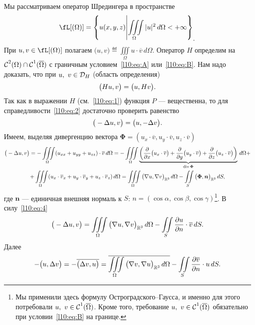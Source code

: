 Мы рассматриваем оператор Шредингера в пространстве 
\begin{equation*}
	\hfill\fL[(\Omega)]=\left\{u(x,y,z)\middle|\iiint\limits_{\Omega}|u|^2\,d\Omega<+\infty\right\}_{\displaystyle.}\hfill
\end{equation*}
При $u,v\in\fL[(\Omega)]$ полагаем $\displaystyle\big(u,v\big)\eqdef\iiint\limits_{\Omega}u\cdot\overline{v}\,d\Omega$. Оператор $H$ определим на $\mathcal{C}{\mathstrut}^{2}_{}(\Omega)\cap\mathcal{C}{\mathstrut}^{1}_{}(\overline{\Omega})$ с граничным условием~\eqref{l10:eq:A} или~\eqref{l10:eq:B}. Нам надо доказать, что при $u,\ v\in\mc{D}_{H}$ (область определения)
\begin{equation}\label{l10:eq:2}
	\hfill\big(Hu,v\big)=\big(u,Hv\big).\hfill
\end{equation}
Так как в выражении $H$ (см.~\eqref{l10:eq:1}) функция $P$ --- вещественна, то для справедливости~\eqref{l10:eq:2} достаточно проверить равенство
\begin{equation}\label{l10:eq:3}
	\hfill\big(-\Delta u,v\big)=\big(u,-\Delta v\big).\hfill
\end{equation}
Имеем, выделяя дивергенцию вектора $\bm{\Phi}=(u_x\cdot\overline{v},u_y\cdot\overline{v},u_z\cdot\overline{v})$
\begin{multline}\label{l10:eq:4}
	\big(-\Delta u,v\big)=-\iiint\limits_{\Omega}(u_{xx}+u_{yy}+u_{zz})\cdot\overline{v}\,d\Omega=-\iiint\limits_{\Omega}\underbrace{\left(\frac{\partial}{\partial x}\big(u_x\cdot\overline{v}\big)+\frac{\partial}{\partial y}\big(u_y\cdot\overline{v}\big)+\frac{\partial}{\partial z}\big(u_z\cdot\overline{v}\big)\right)}_{\operatorname{div}\bm{\Phi}}\,d\Omega+\\
	+\iiint\limits_{\Omega}(u_x\cdot\overline{v}_x+u_y\cdot\overline{v}_y+u_z\cdot\overline{v}_z)\,d\Omega=\iiint\limits_{\Omega}\big(\nabla u,\nabla v\big)_{\mathbb{R}^3}\,d\Omega-\iint\limits_{S}\big(\bm{\Phi},\bm{n}\big)_{\mathbb{R}^3}\,dS,
\end{multline}
где $\bm{n}$ --- единичная внешняя нормаль к $S$: $n=(\cos\alpha,\cos\beta,\cos\gamma)$\footnote{Мы применили здесь формулу Остроградского--Гаусса, и именно для этого потребовали $u,\ v\in\Cfn{1}(\overline{\Omega})$. Кроме того, требование $u,\ v\in\Cfn{1}(\overline{\Omega})$ обязательно при условии~\eqref{l10:eq:B} на границе.}. %
В силу~\eqref{l10:eq:4}
\begin{equation}\label{l10:eq:5}
	\big(-\Delta u,v\big)=\iiint\limits_{\Omega}\big(\nabla u,\nabla v\big)_{\mathbb{R}^3}\,d\Omega-\iint\limits_{S}\frac{\partial u}{\partial n}\cdot\overline{v}\,dS.
\end{equation}
Далее
\begin{equation}\label{l10:eq:6}
	-\big(u,\Delta v\big)=-\overline{\big(\Delta v,u\big)}=\overline{\iiint\limits_{\Omega}\big(\nabla v,\nabla u\big)_{\mathbb{R}^3}\,d\Omega}-\iint\limits_{S}\frac{\partial\overline{v}}{\partial n}\cdot u\,dS.
\end{equation}
